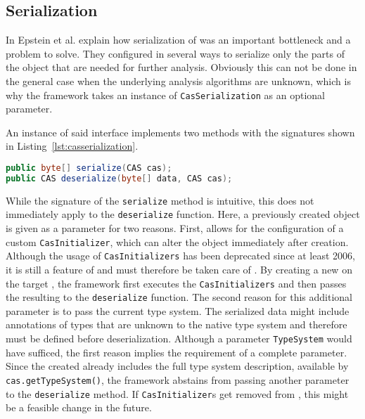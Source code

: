 \subsection{Serialization}
In \cite{epstein2012making} Epstein et al. explain how serialization of \cas{} was an important bottleneck and a problem to solve. They configured \uimaas{} in several ways to serialize only the parts of the \cas{} object that are needed for further analysis. Obviously this can not be done in the general case when the underlying analysis algorithms are unknown, which is why the framework takes an instance of \lstinline|CasSerialization| as an optional parameter.

An instance of said interface implements two methods with the signatures shown in Listing~\ref{lst:casserialization}.
\begin{lstlisting}[language=Java,caption={CasSerialization method signatures},label=lst:casserialization,float]
public byte[] serialize(CAS cas);
public CAS deserialize(byte[] data, CAS cas);
\end{lstlisting}

While the signature of the \lstinline|serialize| method is intuitive, this does not immediately apply to the \lstinline|deserialize| function. Here, a previously created \cas{} object is given as a parameter for two reasons. First, \uima{} allows for the configuration of a custom \lstinline|CasInitializer|, which can alter the \cas{} object immediately after creation. Although the usage of \lstinline|CasInitializers| has been deprecated since at least 2006, it is still a feature of \uima{} and must therefore be taken care of \cite{uimacpe}. By creating a new \cas{} on the target \jvm{}, the framework first executes the \lstinline|CasInitializers| and then passes the resulting \cas{} to the \lstinline|deserialize| function. The second reason for this additional parameter is to pass the current \uima{} type system. The serialized data might include annotations of types that are unknown to the native \uima{} type system and therefore must be defined before deserialization. Although a parameter \lstinline|TypeSystem| would have sufficed, the first reason implies the requirement of a complete \cas{} parameter. Since the created \cas{} already includes the full type system description, available by \lstinline|cas.getTypeSystem()|, the framework abstains from passing another parameter to the \lstinline|deserialize| method. If \lstinline|CasInitializer|s get removed from \uima{}, this might be a feasible change in the future.

